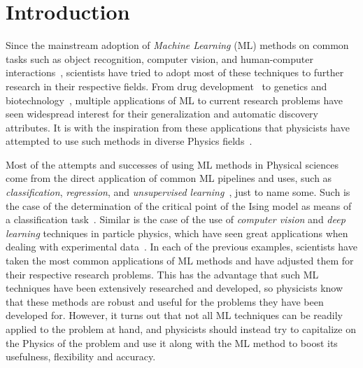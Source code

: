 \chapter{Introduction}
\label{Cap1}

Since the mainstream adoption of \emph{Machine Learning} (ML) methods
on common tasks such as object recognition, computer vision,
and human-computer interactions~\cite{lecunDeepLearning2015},
scientists have tried to adopt most of these techniques to further research
in their respective fields. From drug development~\cite{redaMachineLearningApplications2020}
to genetics and biotechnology~\cite{libbrechtMachineLearningApplications2015},
multiple applications of ML to current research problems have seen
widespread interest for their generalization and automatic discovery attributes.
It is with the inspiration from these applications that physicists have attempted to use 
such methods in diverse Physics fields~\cite{carleoMachineLearningPhysical2019a,dunjkoMachineLearningArtificial2018,carrasquillaMachineLearningPhases2017a}.

Most of the attempts and successes of using ML methods in Physical sciences come from
the direct application of common ML pipelines and uses, such as \emph{classification},
\emph{regression}, and \emph{unsupervised learning}~\cite{hastieElementsStatisticalLearning2009}, just to name some.
Such is the case of the determination of the
critical point of the Ising model as means of a classification task~\cite{carrasquillaMachineLearningPhases2017a}.
Similar is the case of the use of \emph{computer vision} and \emph{deep learning} 
techniques in particle physics, which have seen great applications when dealing with 
experimental data~\cite{radovicMachineLearningEnergy2018}.
In each of the previous examples, scientists have taken the most common applications
of ML methods and have adjusted them for their respective research problems.
This has the advantage that such ML techniques have been extensively researched
and developed, so physicists know that these methods are robust and useful for
the problems they have been developed for.
However, it turns out that not all ML techniques can be readily applied to the problem
at hand, and physicists should instead try to capitalize on the Physics of the problem and
use it along with the ML method to boost its usefulness, flexibility and accuracy.

